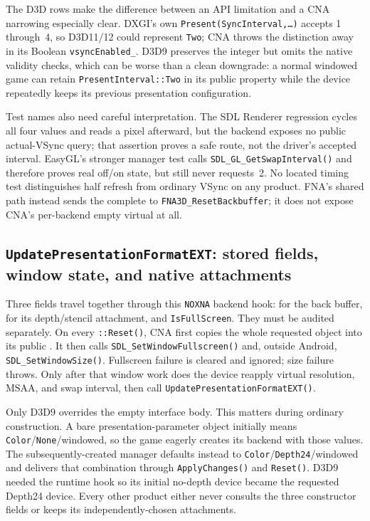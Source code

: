 The D3D rows make the difference between an API limitation and a CNA narrowing especially
clear. DXGI's own \texttt{Present(SyncInterval,\ldots)} accepts 1 through~4, so D3D11/12
could represent \texttt{Two}; CNA throws the distinction away in its Boolean
\texttt{vsyncEnabled\_}. D3D9 preserves the integer but omits the native validity checks,
which can be worse than a clean downgrade: a normal windowed game can retain
\texttt{PresentInterval::Two} in its public property while the device repeatedly keeps its
previous presentation configuration.

Test names also need careful interpretation. The SDL Renderer regression cycles all four
values and reads a pixel afterward, but the backend exposes no public actual-VSync query;
that assertion proves a safe route, not the driver's accepted interval. EasyGL's stronger
manager test calls \texttt{SDL\_GL\_GetSwapInterval()} and therefore proves real off/on
state, but still never requests~2. No located timing test distinguishes half refresh from
ordinary VSync on any product. FNA's shared path instead sends the complete
 to \texttt{FNA3D\_ResetBackbuffer}; it does not expose
CNA's per-backend empty virtual at all.

\subsection{\texttt{UpdatePresentationFormatEXT}: stored fields, window state, and native attachments}
\label{sec:backend-presentation-format-matrix}

Three fields travel together through this \texttt{NOXNA} backend hook:
 for the back buffer,  for its depth/stencil
attachment, and \texttt{IsFullScreen}. They must be audited separately. On every
\texttt{::Reset()}, CNA first copies the whole requested object into
its public . It then calls
\texttt{SDL\_SetWindowFullscreen()} and, outside Android,
\texttt{SDL\_SetWindowSize()}. Fullscreen failure is cleared and ignored; size failure throws.
Only after that window work does the device reapply virtual resolution, MSAA, and swap
interval, then call \texttt{UpdatePresentationFormatEXT()}.

Only D3D9 overrides the empty interface body. This matters during ordinary 
construction. A bare presentation-parameter object initially means
\texttt{Color}/\texttt{None}/windowed, so the game eagerly creates its backend with those
values. The subsequently-created manager defaults instead to
\texttt{Color}/\texttt{Depth24}/windowed and delivers that combination through
\texttt{ApplyChanges()} and \texttt{Reset()}. D3D9 needed the runtime hook so its initial
no-depth device became the requested Depth24 device. Every other product either never
consults the three constructor fields or keeps its independently-chosen attachments.

